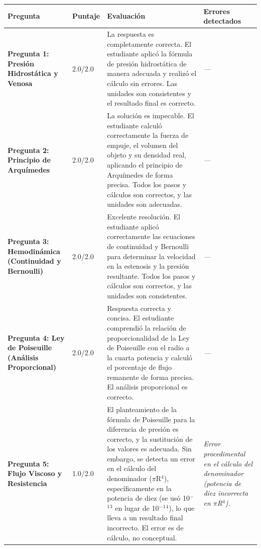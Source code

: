 \documentclass[11pt,a4paper]{article}
\begin{document}
\begin{longtable}{>{\bfseries}p{2.8cm} p{1.6cm} p{7.0cm} p{2.8cm}}
  \toprule
  \textbf{Pregunta} & \textbf{Puntaje} & \textbf{Evaluación} & \textbf{Errores detectados} \\
  \midrule
  \endhead
  \bottomrule
  \endfoot
    \textbf{Pregunta 1: Presión Hidrostática y Venosa} & 2.0/2.0 & La respuesta es completamente correcta. El estudiante aplicó la fórmula de presión hidrostática de manera adecuada y realizó el cálculo sin errores. Las unidades son consistentes y el resultado final es correcto. & \textit{---} \\
    \midrule
    \textbf{Pregunta 2: Principio de Arquímedes} & 2.0/2.0 & La solución es impecable. El estudiante calculó correctamente la fuerza de empuje, el volumen del objeto y su densidad real, aplicando el principio de Arquímedes de forma precisa. Todos los pasos y cálculos son correctos, y las unidades son adecuadas. & \textit{---} \\
    \midrule
    \textbf{Pregunta 3: Hemodinámica (Continuidad y Bernoulli)} & 2.0/2.0 & Excelente resolución. El estudiante aplicó correctamente las ecuaciones de continuidad y Bernoulli para determinar la velocidad en la estenosis y la presión resultante. Todos los pasos y cálculos son correctos, y las unidades son consistentes. & \textit{---} \\
    \midrule
    \textbf{Pregunta 4: Ley de Poiseuille (Análisis Proporcional)} & 2.0/2.0 & Respuesta correcta y concisa. El estudiante comprendió la relación de proporcionalidad de la Ley de Poiseuille con el radio a la cuarta potencia y calculó el porcentaje de flujo remanente de forma precisa. El análisis proporcional es correcto. & \textit{---} \\
    \midrule
    \textbf{Pregunta 5: Flujo Viscoso y Resistencia} & 1.0/2.0 & El planteamiento de la fórmula de Poiseuille para la diferencia de presión es correcto, y la sustitución de los valores es adecuada. Sin embargo, se detecta un error en el cálculo del denominador ($\pi$R$^{4}$), específicamente en la potencia de diez (se usó 10$^{-}$$^{1}$$^{3}$ en lugar de 10$^{-}$$^{1}$$^{4}$), lo que lleva a un resultado final incorrecto. El error es de cálculo, no conceptual. & \textit{Error procedimental en el cálculo del denominador (potencia de diez incorrecta en $\pi$R$^{4}$).} \\
    \midrule
\end{longtable}

\end{document}
